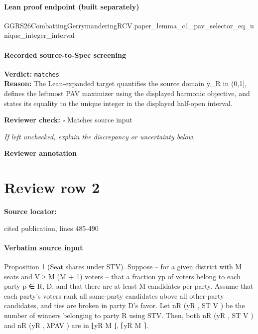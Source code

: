 \documentclass[10pt]{article}
\newcommand{\reviewerbox}{%
  \par\noindent\fbox{\parbox{0.96\linewidth}{\rule{0pt}{0.38in}}}\par
}
\newcommand{\reviewmatch}[1]{%
  \par\noindent\textbf{Reviewer check:} $\square$\; #1\par
  \noindent\emph{If left unchecked, explain the discrepancy or uncertainty below.}\par
}
\begin{document}
\paragraph{Lean proof endpoint (built separately)}\begin{ReviewVerbatim}
GGRS26CombattingGerrymanderingRCV.paper_lemma_c1_pav_selector_eq_unique_integer_interval
\end{ReviewVerbatim}

\paragraph{Recorded source-to-Spec screening}
\textbf{Verdict:} \texttt{matches}
\\
\textbf{Reason:} The Lean-expanded target quantifies the source domain y\_R in (0,1], defines the leftmost PAV maximizer using the displayed harmonic objective, and states its equality to the unique integer in the displayed half-open interval.
\reviewmatch{Matches source input}
\noindent\textbf{Reviewer annotation}\par
\reviewerbox
\clearpage
\hypertarget{source-claim-fbce9a9eb0cbc369}{}
\section*{Review row 2}
\textbf{Source locator:} {\footnotesize\raggedright cited publication, lines 485-\allowbreak{}490\par}
\paragraph{Verbatim source input}
\begin{ReviewVerbatim}
Proposition 1 (Seat shares under STV). Suppose – for a given district with M seats and V ≥
M (M + 1) voters – that a fraction yp of voters belong to each party p ∈ {R, D}, and that there are
at least M candidates per party. Assume that each party’s voters rank all same-party candidates
above all other-party candidates, and ties are broken in party D’s favor.
    Let nR (yR , ST V ) be the number of winners belonging to party R using STV. Then, both
nR (yR , ST V ) and nR (yR , λPAV ) are in {⌊yR M ⌋, ⌈yR M ⌉}.
\end{ReviewVerbatim}
\end{document}
